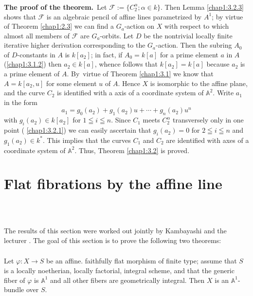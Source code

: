 \subsubsection{}\label{chap1:3.2.4}
{\bf The proof of the theorem.}~Let
$\mathscr{F}:=\{C^{\alpha}_{2};\alpha\in k\}$. Then Lemma
\ref{chap1:3.2.3} shows that $\mathscr{F}$ is an algebraic pencil of
affine lines parametrized by $A^{1}$; by virtue of Theorem
\ref{chap1:2.3} we can find a $G_{a}$-action on $X$ with respect to which
almost all members of $\mathscr{F}$ are $G_{a}$-orbits. Let $D$ be the
nontrivial locally finite iterative higher derivation corresponding to
the $G_{a}$-action. Then the subring $A_{0}$ of $D$-constants in $A$
is $k[a_{2}]$; in fact, if $A_{0}=k[a]$ for a prime element $a$ in $A$
(\cf \ref{chap1:3.1.2}) then $a_{2}\in k[a]$, whence follows that
$k[a_{2}]=k[a]$ because $a_{2}$ is a prime element of
$A$. By\pageoriginale\ virtue of Theorem \ref{chap1:3.1} we know that
$A=k[a_{2},u]$ for some element $u$ of $A$. Hence $X$ is isomorphic to
the affine plane, and the curve $C_{2}$ is identified with a axis of a
coordinate system of $\mathbb{A}^{2}$. Write $a_{1}$ in the form
$$
a_{1}=g_{0}(a_{2})+g_{1}(a_{2})u+\cdots+g_{n}(a_{2})u^{n}
$$
with $g_{i}(a_{2})\in k[a_{2}]$ for $1\leqq i\leqq n$. Since $C_{1}$
meets $C^{\alpha}_{2}$ transversely only in one point (\cf
\ref{chap1:3.2.1}) we can easily ascertain that $g_{i}(a_{2})=0$ for $2\leqq
i\leqq n$ and $g_{1}(a_{2})\in k^{\ast}$. This implies that the curves
$C_{1}$ and $C_{2}$ are identified with axes of a coordinate system of
$\mathbb{A}^{2}$. Thus, Theorem \ref{chap1:3.2} is proved.

\section{Flat fibrations by the affine line}\label{chap1:sec4}\pageoriginale\

\subsection{}\label{chap1:4.1}
The results of this section were worked out jointly by Kambayashi and
the lecturer \cite{28}. The goal of this section is to prove the
following two theorems:

\subsubsection{}\label{chap1:4.1.1}
\begin{theorem*}
  Let $\varphi:X\to S$ be an affine. faithfully flat morphism of finite
  type; assume that $S$ is a locally noetherian, locally factorial,
  integral scheme, and that the generic fiber of $\varphi$ is
  $\mathbb{A}^{1}$ and all other fibers are geometrically integral. Then
  $X$ is an $\mathbb{A}^{1}$-bundle over $S$.
\end{theorem*}

